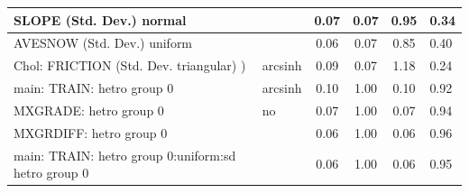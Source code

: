 \begin{table}
\begin{center}
\begin{tabular}{|l|l|c|c|c|l|}
			\hline
			SLOPE (Std. Dev.) normal &  & 0.07 & 0.07 & 0.95 & 0.34 \\
			\hline
			AVESNOW (Std. Dev.) uniform &  & 0.06 & 0.07 & 0.85 & 0.40 \\
			\hline
			 Chol: FRICTION (Std. Dev. triangular) ) & arcsinh & 0.09 & 0.07 & 1.18 & 0.24 \\
			\hline
			main: TRAIN: hetro group 0 & arcsinh & 0.10 & 1.00 & 0.10 & 0.92 \\
			\hline
			MXGRADE: hetro group 0 & no & 0.07 & 1.00 & 0.07 & 0.94 \\
			\hline
			MXGRDIFF: hetro group 0 &  & 0.06 & 1.00 & 0.06 & 0.96 \\
			\hline
			main: TRAIN: hetro group 0:uniform:sd  hetro group 0 &  & 0.06 & 1.00 & 0.06 & 0.95 \\
			\hline
		\end{tabular}
	\end{center}
\end{table}